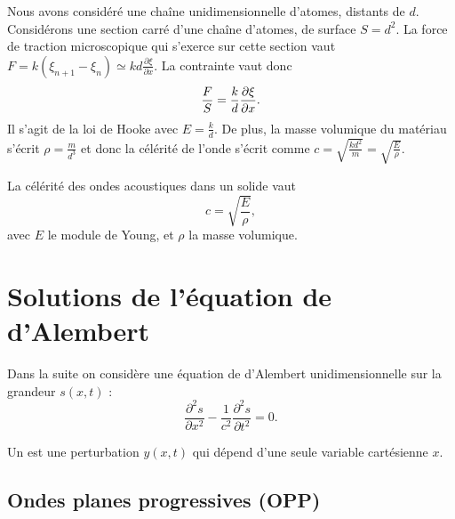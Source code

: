\documentclass[12pt,fancy]{cours}
\begin{document}
Nous avons considéré une chaîne unidimensionnelle d'atomes, distants de $d$. Considérons une section carré d’une chaîne d’atomes, de surface $S=d^2$. La force de traction microscopique qui s’exerce sur cette section vaut $F=k(\xi_{n+1}-\xi_n)\simeq kd\frac{\partial\xi}{\partial x}$. La contrainte vaut donc
\begin{equation}
  \frac{F}{S} = \frac{k}{d} \frac{\partial{\xi}}{\partial{x}}.
\end{equation}
 Il s'agit de la loi de Hooke avec $E=\frac{k}{d}$. De plus, la masse volumique du matériau s'écrit $\rho=\frac{m}{d^3}$ et donc la célérité de l'onde s'écrit comme $c=\sqrt{\frac{k d^2}{m}} =\sqrt{\frac{E}{\rho}} $.
 \begin{theorem}\label{form:}
   La célérité des ondes acoustiques dans un solide vaut
   \begin{equation*}
   c=\sqrt{\frac{E}{\rho}},
   \end{equation*}
   avec $E$ le module de Young, et $\rho$ la masse volumique.
 \end{theorem}

\section{Solutions de l'équation de d’Alembert}
Dans la suite on considère une équation de d'Alembert unidimensionnelle sur la grandeur $s(x,t)$ :
\begin{equation}
   \frac{\partial^2 s}{\partial x^2}-\frac{1}{c^2}\frac{\partial^2 s}{\partial t^2}=0.
\end{equation}
\begin{definition}\label{def:}
  Un  est une perturbation $y(x,t)$ qui dépend d'une seule variable cartésienne $x$.
\end{definition}
\subsection{Ondes planes progressives (OPP)}
\end{document}
